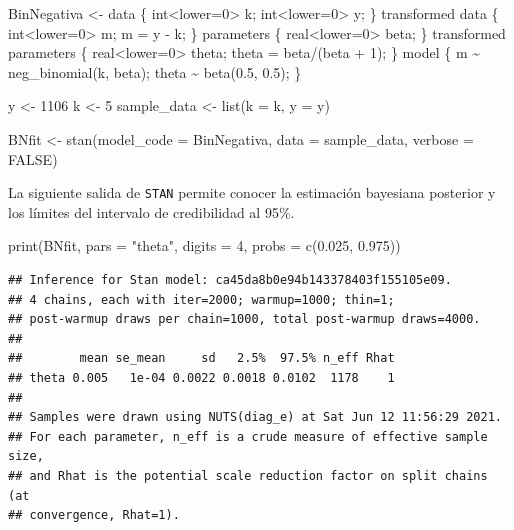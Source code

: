 \documentclass[
  10pt,
  spanish,
]{book}
\newenvironment{Shaded}{\begin{snugshade}}{\end{snugshade}}
\newcommand{\AttributeTok}[1]{\textcolor[rgb]{0.77,0.63,0.00}{#1}}
\newcommand{\ConstantTok}[1]{\textcolor[rgb]{0.00,0.00,0.00}{#1}}
\newcommand{\DecValTok}[1]{\textcolor[rgb]{0.00,0.00,0.81}{#1}}
\newcommand{\FloatTok}[1]{\textcolor[rgb]{0.00,0.00,0.81}{#1}}
\newcommand{\FunctionTok}[1]{\textcolor[rgb]{0.00,0.00,0.00}{#1}}
\newcommand{\NormalTok}[1]{#1}
\newcommand{\OtherTok}[1]{\textcolor[rgb]{0.56,0.35,0.01}{#1}}
\newcommand{\StringTok}[1]{\textcolor[rgb]{0.31,0.60,0.02}{#1}}
\theoremstyle{definition}
\theoremstyle{definition}
\theoremstyle{definition}
\theoremstyle{definition}
\theoremstyle{remark}
\begin{document}
\begin{Shaded}
\begin{Highlighting}[]
\NormalTok{BinNegativa }\OtherTok{\textless{}{-}} \StringTok{\textquotesingle{}data \{}
\StringTok{  int\textless{}lower=0\textgreater{} k;}
\StringTok{  int\textless{}lower=0\textgreater{} y;}
\StringTok{\}}
\StringTok{transformed data \{}
\StringTok{  int\textless{}lower=0\textgreater{} m;}
\StringTok{  m = y {-} k;}
\StringTok{\}}
\StringTok{parameters \{}
\StringTok{  real\textless{}lower=0\textgreater{} beta;}
\StringTok{\}}
\StringTok{transformed parameters \{}
\StringTok{  real\textless{}lower=0\textgreater{} theta;}
\StringTok{  theta = beta/(beta + 1);}
\StringTok{\}}
\StringTok{model \{}
\StringTok{  m \textasciitilde{} neg\_binomial(k, beta);}
\StringTok{  theta \textasciitilde{} beta(0.5, 0.5);}
\StringTok{\}}
\StringTok{\textquotesingle{}}

\NormalTok{y }\OtherTok{\textless{}{-}} \DecValTok{1106}
\NormalTok{k }\OtherTok{\textless{}{-}} \DecValTok{5}
\NormalTok{sample\_data }\OtherTok{\textless{}{-}} \FunctionTok{list}\NormalTok{(}\AttributeTok{k =}\NormalTok{ k, }\AttributeTok{y =}\NormalTok{ y)}

\NormalTok{BNfit }\OtherTok{\textless{}{-}} \FunctionTok{stan}\NormalTok{(}\AttributeTok{model\_code =}\NormalTok{ BinNegativa,}
              \AttributeTok{data =}\NormalTok{ sample\_data, }\AttributeTok{verbose =} \ConstantTok{FALSE}\NormalTok{)}
\end{Highlighting}
\end{Shaded}

La siguiente salida de \texttt{STAN} permite conocer la estimación bayesiana posterior y los límites del intervalo de credibilidad al 95\%.

\begin{Shaded}
\begin{Highlighting}[]
\FunctionTok{print}\NormalTok{(BNfit, }\AttributeTok{pars =} \StringTok{"theta"}\NormalTok{, }
      \AttributeTok{digits =} \DecValTok{4}\NormalTok{, }\AttributeTok{probs =} \FunctionTok{c}\NormalTok{(}\FloatTok{0.025}\NormalTok{, }\FloatTok{0.975}\NormalTok{))}
\end{Highlighting}
\end{Shaded}

\begin{verbatim}
## Inference for Stan model: ca45da8b0e94b143378403f155105e09.
## 4 chains, each with iter=2000; warmup=1000; thin=1; 
## post-warmup draws per chain=1000, total post-warmup draws=4000.
## 
##        mean se_mean     sd   2.5%  97.5% n_eff Rhat
## theta 0.005   1e-04 0.0022 0.0018 0.0102  1178    1
## 
## Samples were drawn using NUTS(diag_e) at Sat Jun 12 11:56:29 2021.
## For each parameter, n_eff is a crude measure of effective sample size,
## and Rhat is the potential scale reduction factor on split chains (at 
## convergence, Rhat=1).
\end{verbatim}
\end{document}
